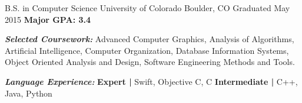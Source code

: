 \begin{cventries}
  \cventry
    {B.S. in Computer Science}
    {University of Colorado}
    {Boulder, CO}
    {Graduated May 2015}
    {\textbf{Major GPA: 3.4}}
    \begin{flushleft}
    \begin{footnotesize}
    \textbf{\textit{Selected Coursework:}}
    {Advanced Computer Graphics, Analysis of Algorithms, Artificial Intelligence, Computer Organization, Database 	   Information Systems, Object Oriented Analysis and Design, Software Engineering Methods and Tools.}
    
    \textbf{\textit{Language Experience:}}
    {\textbf{Expert |} Swift, Objective C, C 
    \textbf{Intermediate |} C++, Java, Python}
    \end{footnotesize}
    \end{flushleft}
    
\end{cventries}
